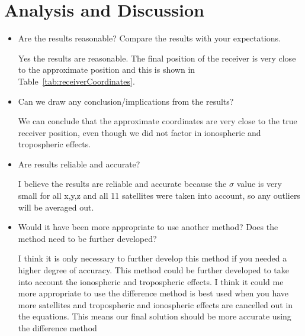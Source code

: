 \section{Analysis and Discussion} %
\label{sec:analysis_and_discussion}
\begin{itemize}
	\item Are the results reasonable? Compare the results with your expectations.
	
	Yes the results are reasonable.  The final position of the receiver is very close to the approximate position and this is shown in Table~\ref{tab:receiverCoordinates}.
	\item Can we draw any conclusion/implications from the results?  
	
	We can conclude that the approximate coordinates are very close to the true receiver position, even though we did not factor in ionospheric and tropospheric effects.
	\item Are results reliable and accurate?
	
	I believe the results are reliable and accurate because the $\sigma$ value is very small for all x,y,z and all 11 satellites were taken into account, so any outliers will be averaged out.
	\item Would it have been more appropriate to use another method? Does the method need to be further developed?
	
	I think it is only necessary to further develop this method if you needed a higher degree of accuracy.  This method could be further developed to take into account the ionospheric and tropospheric effects.  I think it could me more appropriate to use the difference method is best used when you have more satellites and tropospheric and ionospheric effects are cancelled out in the equations.  This means our final solution should be more accurate using the difference method
\end{itemize}

